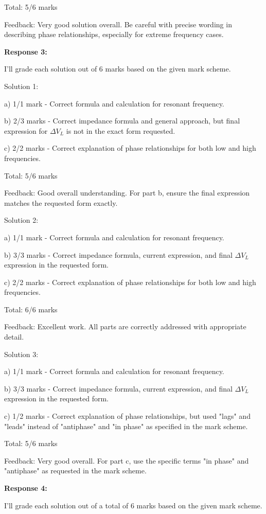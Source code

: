 \documentclass[a4paper,11pt]{article}
\begin{document}
Total: 5/6 marks

Feedback: Very good solution overall. Be careful with precise wording in describing phase relationships, especially for extreme frequency cases.

\bigskip
\textbf{Response 3:}

I'll grade each solution out of 6 marks based on the given mark scheme.

Solution 1:

a) 1/1 mark - Correct formula and calculation for resonant frequency.

b) 2/3 marks - Correct impedance formula and general approach, but final expression for \(\Delta V_L \) is not in the exact form requested.

c) 2/2 marks - Correct explanation of phase relationships for both low and high frequencies.

Total: 5/6 marks

Feedback: Good overall understanding. For part b, ensure the final expression matches the requested form exactly.

Solution 2:

a) 1/1 mark - Correct formula and calculation for resonant frequency.

b) 3/3 marks - Correct impedance formula, current expression, and final \(\Delta V_L \) expression in the requested form.

c) 2/2 marks - Correct explanation of phase relationships for both low and high frequencies.

Total: 6/6 marks

Feedback: Excellent work. All parts are correctly addressed with appropriate detail.

Solution 3:

a) 1/1 mark - Correct formula and calculation for resonant frequency.

b) 3/3 marks - Correct impedance formula, current expression, and final \(\Delta V_L \) expression in the requested form.

c) 1/2 marks - Correct explanation of phase relationships, but used "lags" and "leads" instead of "antiphase" and "in phase" as specified in the mark scheme.

Total: 5/6 marks

Feedback: Very good overall. For part c, use the specific terms "in phase" and "antiphase" as requested in the mark scheme.

\bigskip
\textbf{Response 4:}

I'll grade each solution out of a total of 6 marks based on the given mark scheme.
\end{document}
